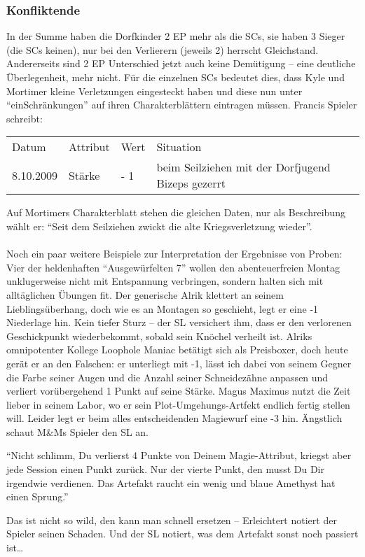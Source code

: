 \subsubsection{Konfliktende}

In der Summe haben die Dorfkinder 2 EP mehr als die SCs, sie haben 3 Sieger (die SCs keinen), nur bei den Verlierern (jeweils 2) herrscht Gleichstand. Andererseits sind 2 EP Unterschied jetzt auch keine Demütigung -- eine deutliche Überlegenheit, mehr nicht.
Für die einzelnen SCs bedeutet dies, dass Kyle und Mortimer kleine Verletzungen eingesteckt haben und diese nun unter "`einSchränkungen"' auf ihren Charakterblättern eintragen müssen. Francis Spieler schreibt:

\begin{table}[H]
\begin{tabular}{|l|l|l|l|}
\hline
Datum & Attribut & Wert & Situation\\
8.10.2009 & Stärke & - 1 & beim Seilziehen mit der Dorfjugend Bizeps gezerrt\\
\hline
\end{tabular}
\end{table}

Auf Mortimers Charakterblatt stehen die gleichen Daten, nur als Beschreibung wählt er: "`Seit dem Seilziehen zwickt die alte Kriegsverletzung wieder"'.
\\
\\
Noch ein paar weitere Beispiele zur Interpretation der Ergebnisse von Proben:
\\
Vier der heldenhaften "`Ausgewürfelten 7"' wollen den abenteuerfreien Montag unklugerweise nicht mit Entspannung verbringen, sondern halten sich mit alltäglichen Übungen fit. Der generische Alrik klettert an seinem Lieblingsüberhang, doch wie es an Montagen so geschieht, legt er eine -1 Niederlage hin. Kein tiefer Sturz -- der SL versichert ihm, dass er den verlorenen Geschickpunkt wiederbekommt, sobald sein Knöchel verheilt ist. Alriks omnipotenter Kollege Loophole Maniac betätigt sich als Preisboxer, doch heute gerät er an den Falschen: er unterliegt mit -1, lässt ich dabei von seinem Gegner die Farbe seiner Augen und die Anzahl seiner Schneidezähne anpassen und verliert vorübergehend 1 Punkt auf seine Stärke.
Magus Maximus nutzt die Zeit lieber in seinem Labor, wo er sein Plot-Umgehungs-Artfekt endlich fertig stellen will. Leider legt er beim alles entscheidenden Magiewurf eine -3 hin. Ängstlich schaut M\&Ms Spieler den SL an.

"`Nicht schlimm, Du verlierst 4 Punkte von Deinem Magie-Attribut, kriegst aber jede Session einen Punkt zurück. Nur der vierte Punkt, den musst Du Dir irgendwie verdienen. Das Artefakt raucht ein wenig und blaue Amethyst hat einen Sprung."'

Das ist nicht so wild, den kann man schnell ersetzen -- Erleichtert notiert der Spieler seinen Schaden. Und der SL notiert, was dem Artefakt sonst noch passiert ist\dots


